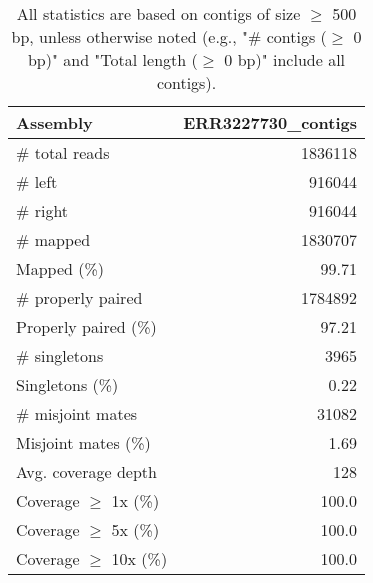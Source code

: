 \documentclass[12pt,a4paper]{article}
\begin{document}
\begin{table}[ht]
\begin{center}
\caption{All statistics are based on contigs of size $\geq$ 500 bp, unless otherwise noted (e.g., "\# contigs ($\geq$ 0 bp)" and "Total length ($\geq$ 0 bp)" include all contigs).}
\begin{tabular}{|l*{1}{|r}|}
\hline
Assembly & ERR3227730\_contigs \\ \hline
\# total reads & 1836118 \\ \hline
\# left & 916044 \\ \hline
\# right & 916044 \\ \hline
\# mapped & 1830707 \\ \hline
Mapped (\%) & 99.71 \\ \hline
\# properly paired & 1784892 \\ \hline
Properly paired (\%) & 97.21 \\ \hline
\# singletons & 3965 \\ \hline
Singletons (\%) & 0.22 \\ \hline
\# misjoint mates & 31082 \\ \hline
Misjoint mates (\%) & 1.69 \\ \hline
Avg. coverage depth & 128 \\ \hline
Coverage $\geq$ 1x (\%) & 100.0 \\ \hline
Coverage $\geq$ 5x (\%) & 100.0 \\ \hline
Coverage $\geq$ 10x (\%) & 100.0 \\ \hline
\end{tabular}
\end{center}
\end{table}
\end{document}
